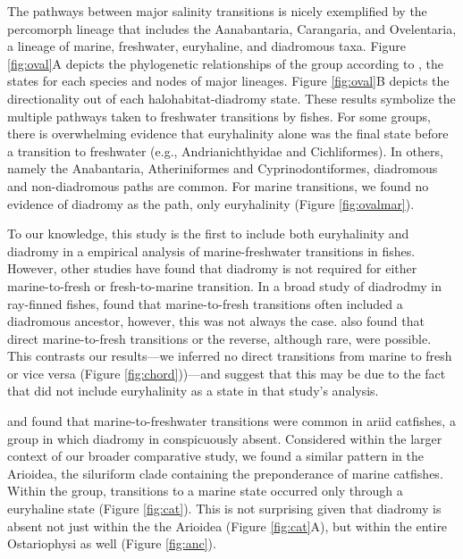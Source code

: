 \documentclass[11pt]{article}
\begin{document}
The pathways between major salinity transitions is nicely exemplified by the percomorph lineage that includes the Aanabantaria, Carangaria, and Ovelentaria, a lineage of marine, freshwater, euryhaline, and diadromous taxa. Figure \ref{fig:oval}A depicts the phylogenetic relationships of the group according to \citep{rabosky2018inverse}, the states for each species and nodes of major lineages. Figure \ref{fig:oval}B depicts the directionality out of each halohabitat-diadromy state. These results symbolize the multiple pathways taken to freshwater transitions by fishes. For some groups, there is overwhelming evidence that euryhalinity alone was the final state before a transition to freshwater (e.g., Andrianichthyidae and Cichliformes). In others, namely the Anabantaria, Atheriniformes and Cyprinodontiformes, diadromous and non-diadromous paths are common. For marine transitions, we found no evidence of diadromy as the path, only euryhalinity (Figure \ref{fig:ovalmar}).

To our knowledge, this study is the first to include both euryhalinity and diadromy in a empirical analysis of marine-freshwater transitions in fishes. However, other studies have found that diadromy is not required for either marine-to-fresh or fresh-to-marine transition. In a broad study of diadrodmy in ray-finned fishes, \cite{corush2019evolutionary} found that marine-to-fresh transitions often included a diadromous ancestor, however, this was not always the case. \cite{corush2019evolutionary} also found that direct marine-to-fresh transitions or the reverse, although rare, were possible. This contrasts our results---we inferred no direct transitions from marine to fresh or vice versa (Figure \ref{fig:chord}))---and suggest that this may be due to the fact that  \cite{corush2019evolutionary} did not include euryhalinity as a state in that study's analysis. 

 \cite{betancur2010molecular} and \cite{betancur2012apparent} found that marine-to-freshwater transitions were common in ariid catfishes, a group in which diadromy in conspicuously absent. Considered within the larger context of our broader comparative study, we found a similar pattern in  the Arioidea, the siluriform clade containing the preponderance of marine catfishes. Within the group, transitions to a marine state occurred only through a euryhaline state (Figure \ref{fig:cat}). This is not surprising given that diadromy is absent not just within the the Arioidea (Figure \ref{fig:cat}A), but within the entire Ostariophysi as well (Figure \ref{fig:anc}).
\end{document}

